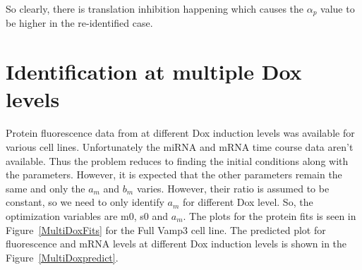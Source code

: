 \documentclass{article}
\begin{document}
So clearly, there is translation inhibition happening which causes the $\alpha_p$ value to be higher in the re-identified case. 

%


\section{Identification at multiple Dox levels}

Protein 
fluorescence data from at different Dox induction levels was available for various cell lines. Unfortunately the miRNA and mRNA time course data aren't available. Thus the problem reduces to finding
the initial conditions along with the parameters. However, it is expected that the other parameters remain
the same and only the $a_m$ and $b_m$ varies. However, their ratio is assumed to be constant, so we need to only identify $a_m$ for different Dox level. So, the optimization variables are m0, s0 and $a_m$. The plots for the
protein fits is seen in Figure~\ref{MultiDoxFits} for the Full Vamp3 cell line. The predicted plot for 
fluorescence and mRNA levels at different
Dox induction levels is shown in the Figure~\ref{MultiDoxpredict}.
\end{document}
